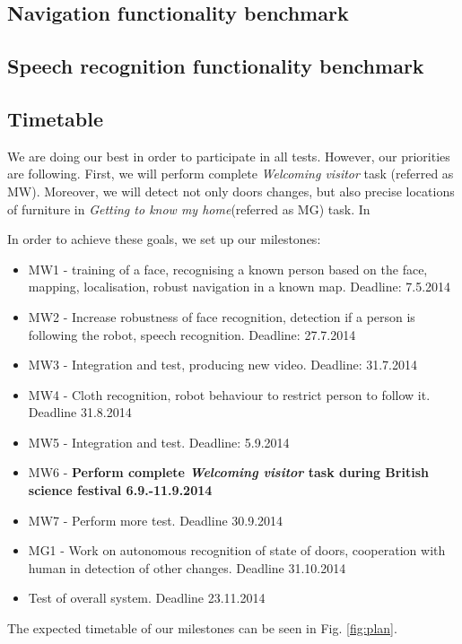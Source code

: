 \subsection{Navigation functionality benchmark}

\subsection{Speech recognition functionality benchmark}

\subsection{Timetable}

We are doing our best in order to participate in all tests. However, our priorities are following.
First, we will perform complete \textit{Welcoming visitor} task (referred as MW). 
Moreover, we will detect not only doors changes, but also precise locations of furniture in \textit{Getting to know my home}(referred as MG) task. 
In \textit{}

 In order to achieve these goals, we set up our milestones:
\begin{itemize}
\item MW1 - training of a face, recognising a known person based on the face, mapping, localisation, robust navigation in a known map. Deadline: 7.5.2014
\item MW2 - Increase robustness of face recognition, detection if a person is following the robot, speech recognition. Deadline: 27.7.2014
\item MW3 - Integration and test, producing new video. Deadline: 31.7.2014
\item MW4 - Cloth recognition, robot behaviour to restrict person to follow it. Deadline 31.8.2014
\item MW5 - Integration and test. Deadline: 5.9.2014
\item MW6 - \textbf{Perform complete \textit{Welcoming visitor} task during British science festival 6.9.-11.9.2014}
\item MW7 - Perform more test. Deadline 30.9.2014
\item MG1 - Work on autonomous recognition of state of doors, cooperation with human in detection of other changes. Deadline 31.10.2014
\item Test of overall system. Deadline 23.11.2014
\end{itemize}
The expected timetable of our milestones can be seen in Fig. \ref{fig:plan}.

